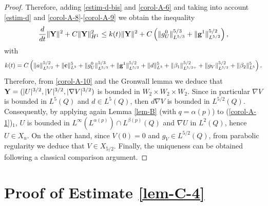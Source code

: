 \documentclass[11pt,reqno]{amsart}%
\numberwithin{equation}{section}
\begin{document}
{\begin{proof}
Therefore, adding \eqref{estim-d-bis} and \eqref{corol-A-6} and taking into account \eqref{estim-d} and \eqref{corol-A-8}-\eqref{corol-A-9} we obtain the inequality 
%
\begin{equation}
\frac{d}{dt}\|{\bf Y} \|^2 + C\|{\bf Y} \|^2_{H^1}
\le k(t) \|{\bf Y} \|^2
+C\left( \|g^0_U\|_{L^{5/3}}^{5/3} +
\|{\bf g}^1\|^{5/2}_{L^{5/2}} \right),
\label{corol-A-10}
\end{equation}
with
$$
k(t)=
C\left(\| a\|^{5/2}_{L^{5/2}}+\|{\bf c}\|^5_{L^5}
+ \|g^0_U\|_{L^{5/3}}^{5/3}
+ \|{\bf g}^1\|^{5/2}_{L^{5/2}}
+\| d \|^5_{L^5}
+\|\beta_1\|^{5/2}_{L^{5/2+}}+\|g_V\|^{5/2}_{L^{5/2}}
+\|\beta_2\|^5_{L^5}
\right).
$$
Therefore, from \eqref{corol-A-10} and the Gronwall lemma we deduce that 
${\bf Y}=(|U|^{3/2},|V|^{3/2},|\nabla V|^{3/2})$ is bounded in $W_2\times W_2\times W_2$. Since in particular $\nabla V$ is bounded in $L^5(Q)$ and $d\in L^{5}(Q)$, then  $d \nabla V$ is bounded in $L^{5/2}(Q)$. Consequently, by applying again Lemma \ref{lem-B} (with $q=\alpha(p)$) to (\ref{corol-A-1})$_1$, $U$ is bounded in $L^\infty(L^{\alpha(p)})\cap L^{\beta(p)}(Q)$  and $\nabla U$ in $L^2(Q)$, hence $U\in X_u$. On the other hand, since $V(0)=0$ and $g_V\in L^{5/2}(Q)$, from parabolic regularity we deduce that $V\in X_{5/2}$.  
Finally, the uniqueness can be obtained following a classical comparison argument.
\end{proof}
\section{Proof of Estimate \eqref{lem-C-4}}


}
\end{document}

